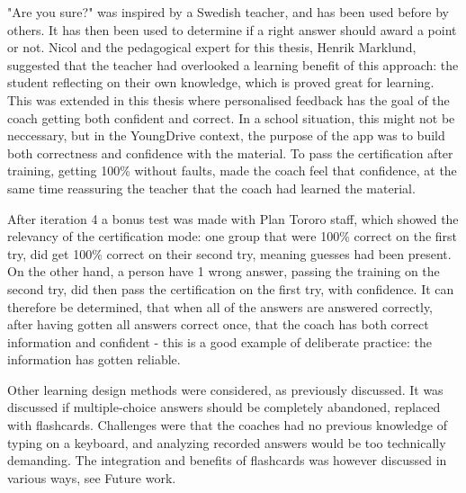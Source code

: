 
  "Are you sure?" was inspired by a Swedish teacher, and has been used before by others. \cite{nicol} It has then been used to determine if a right answer should award a point or not. Nicol and the pedagogical expert for this thesis, Henrik Marklund, suggested that the teacher had overlooked a learning benefit of this approach: the student reflecting on their own knowledge, which is proved great for learning. This was extended in this thesis where personalised feedback has the goal of the coach getting both confident and correct. In a school situation, this might not be neccessary, but in the YoungDrive context, the purpose of the app was to build both correctness and confidence with the material. To pass the certification after training, getting 100\% without faults, made the coach feel that confidence, at the same time reassuring the teacher that the coach had learned the material.

  After iteration 4 a bonus test was made with Plan Tororo staff, which showed the relevancy of the certification mode: one group that were 100\% correct on the first try, did get 100\% correct on their second try, meaning guesses had been present. On the other hand, a person have 1 wrong answer, passing the training on the second try, did then pass the certification on the first try, with confidence. It can therefore be determined, that when all of the answers are answered correctly, after having gotten all answers correct once, that the coach has both correct information and confident - this is a good example of deliberate practice: the information has gotten reliable.

  Other learning design methods were considered, as previously discussed. It was discussed if multiple-choice answers should be completely abandoned, replaced with flashcards. Challenges were that the coaches had no previous knowledge of typing on a keyboard, and analyzing recorded answers would be too technically demanding. The integration and benefits of flashcards was however discussed in various ways, see Future work.
